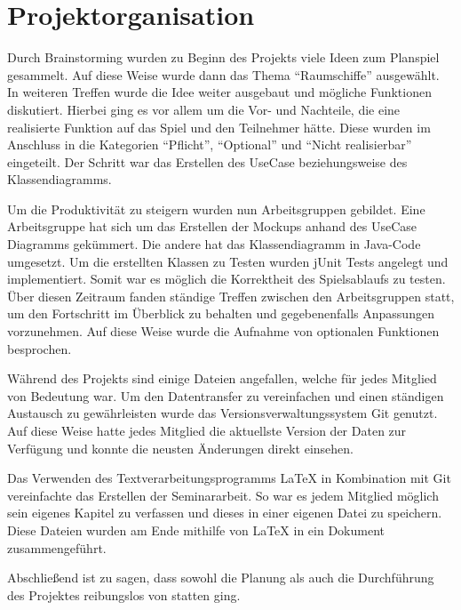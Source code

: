\section{Projektorganisation}
\label{sec:fazit-projektorganisation}

Durch Brainstorming wurden zu Beginn des Projekts viele Ideen zum Planspiel gesammelt. Auf diese Weise wurde dann das Thema “Raumschiffe” ausgewählt. In weiteren Treffen wurde die Idee weiter ausgebaut und mögliche Funktionen diskutiert. Hierbei ging es vor allem um die Vor- und Nachteile, die eine realisierte Funktion auf das Spiel und den Teilnehmer hätte. Diese wurden im Anschluss in die Kategorien “Pflicht”, “Optional” und “Nicht realisierbar” eingeteilt. Der Schritt war das Erstellen des UseCase beziehungsweise des Klassendiagramms. 

Um die Produktivität zu steigern wurden nun Arbeitsgruppen gebildet. Eine Arbeitsgruppe hat sich um das Erstellen der Mockups anhand des UseCase Diagramms gekümmert. Die andere hat das Klassendiagramm  in Java-Code umgesetzt. Um die erstellten Klassen zu Testen wurden jUnit Tests angelegt und implementiert. Somit war es möglich die Korrektheit des Spielsablaufs zu testen. Über diesen Zeitraum fanden ständige Treffen zwischen den Arbeitsgruppen statt, um den Fortschritt im Überblick zu behalten und gegebenenfalls Anpassungen vorzunehmen. Auf diese Weise wurde die Aufnahme von optionalen Funktionen besprochen. 

Während des Projekts sind einige Dateien angefallen, welche für jedes Mitglied von Bedeutung war. Um den Datentransfer zu vereinfachen und einen ständigen Austausch zu gewährleisten wurde das Versionsverwaltungssystem Git genutzt. Auf diese Weise hatte jedes Mitglied die aktuellste Version der Daten zur Verfügung und konnte die neusten Änderungen direkt einsehen. 

Das Verwenden des Textverarbeitungsprogramms \LaTeX{} in Kombination mit Git vereinfachte das Erstellen der Seminararbeit. So war es jedem Mitglied möglich sein eigenes Kapitel zu verfassen und dieses in einer eigenen Datei zu speichern. Diese Dateien wurden am Ende mithilfe von \LaTeX{} in ein Dokument zusammengeführt.

Abschließend ist zu sagen, dass sowohl die Planung als auch die Durchführung des Projektes reibungslos von statten ging.